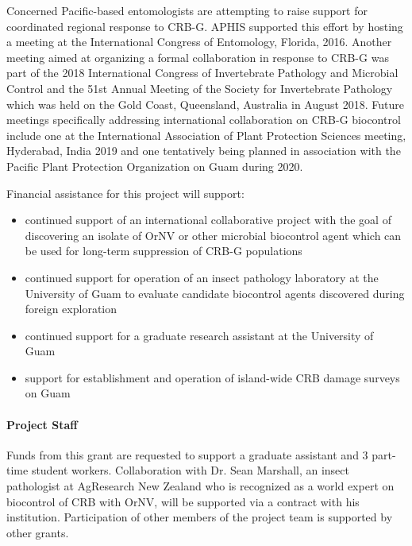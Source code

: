 \documentclass[14pt,english,letterpaper]{scrartcl}
\begin{document}
Concerned Pacific-based entomologists are attempting to raise support for coordinated regional
response to CRB-G. APHIS supported this effort by hosting a meeting at the International
Congress of Entomology, Florida, 2016. Another meeting aimed at organizing a formal
collaboration in response to CRB-G was part of the 2018 International Congress of
Invertebrate Pathology and Microbial Control and the 51st Annual Meeting of the Society for
Invertebrate Pathology which was held on the Gold Coast, Queensland, Australia in August 2018.
Future meetings specifically addressing international collaboration on CRB-G biocontrol include
one at the International Association of Plant Protection Sciences meeting, Hyderabad, India 2019 and
one tentatively being planned in association with the Pacific Plant Protection Organization on Guam during 2020.

\pagebreak

Financial assistance for this project will support:
\begin{itemize}
\item continued support of an international collaborative project with the goal of discovering
an isolate of OrNV or other microbial biocontrol agent which can be used for long-term
suppression of CRB-G populations
\item continued support for operation of an insect pathology laboratory at the University of
Guam to evaluate candidate biocontrol agents discovered during foreign exploration
\item continued support for a graduate research assistant at the University of Guam
\item support for establishment and operation of island-wide CRB damage surveys on Guam
\end{itemize}

\paragraph{Project Staff}

Funds from this grant are requested to support a graduate assistant and 3 part-time student workers.
Collaboration with Dr. Sean Marshall, an insect pathologist at AgResearch New Zealand who is recognized as a world expert on biocontrol of CRB with OrNV, will be supported via a contract with his institution. Participation of other members of the project team is supported by other grants.
\end{document}
